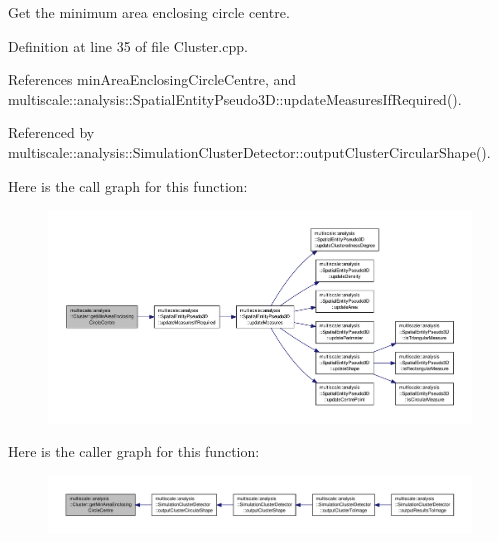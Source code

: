Get the minimum area enclosing circle centre. 



Definition at line 35 of file Cluster.\-cpp.



References min\-Area\-Enclosing\-Circle\-Centre, and multiscale\-::analysis\-::\-Spatial\-Entity\-Pseudo3\-D\-::update\-Measures\-If\-Required().



Referenced by multiscale\-::analysis\-::\-Simulation\-Cluster\-Detector\-::output\-Cluster\-Circular\-Shape().



Here is the call graph for this function\-:\nopagebreak
\begin{figure}[H]
\begin{center}
\leavevmode
\includegraphics[width=350pt]{classmultiscale_1_1analysis_1_1Cluster_a4d93f85faf929336818248e1fd604fb6_cgraph}
\end{center}
\end{figure}




Here is the caller graph for this function\-:\nopagebreak
\begin{figure}[H]
\begin{center}
\leavevmode
\includegraphics[width=350pt]{classmultiscale_1_1analysis_1_1Cluster_a4d93f85faf929336818248e1fd604fb6_icgraph}
\end{center}
\end{figure}


